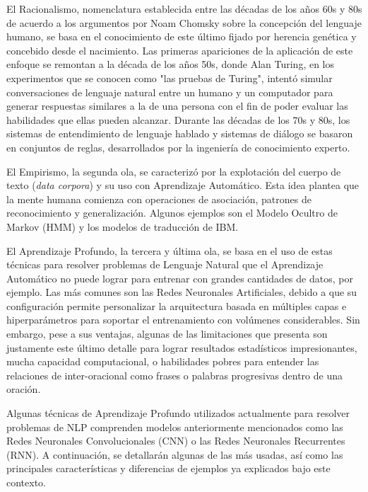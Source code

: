 El Racionalismo, nomenclatura establecida entre las décadas de los años 60s y 80s de acuerdo a los argumentos por Noam Chomsky sobre la concepción del lenguaje humano, se basa en el conocimiento de este último fijado por herencia genética y concebido desde el nacimiento. Las primeras apariciones de la aplicación de este enfoque se remontan a la década de los años 50s, donde Alan Turing, en los experimentos que se conocen como "las pruebas de Turing", intentó simular conversaciones de lenguaje natural entre un humano y un computador para generar respuestas similares a la de una persona con el fin de poder evaluar las habilidades que ellas pueden alcanzar. Durante las décadas de los 70s y 80s, los sistemas de entendimiento de lenguaje hablado y sistemas de diálogo se basaron en conjuntos de reglas, desarrollados por la ingeniería de conocimiento experto.

El Empirismo, la segunda ola, se caracterizó por la explotación del cuerpo de texto (\textit{data corpora}) y su uso con Aprendizaje Automático. Esta idea plantea que la mente humana comienza con operaciones de asociación, patrones de reconocimiento y generalización. Algunos ejemplos son el Modelo Ocultro de Markov (HMM) y los modelos de traducción de IBM.

El Aprendizaje Profundo, la tercera y última ola, se basa en el uso de estas técnicas para resolver problemas de Lenguaje Natural que el Aprendizaje Automático no puede lograr para entrenar con grandes cantidades de datos, por ejemplo. Las más comunes son las Redes Neuronales Artificiales, debido a que su configuración permite personalizar la arquitectura basada en múltiples capas e hiperparámetros para soportar el entrenamiento con volúmenes considerables. Sin embargo, pese a sus ventajas, algunas de las limitaciones que presenta son justamente este último detalle para lograr resultados estadísticos impresionantes, mucha capacidad computacional, o habilidades pobres para entender las relaciones de inter-oracional como frases o palabras progresivas dentro de una oración.

Algunas técnicas de Aprendizaje Profundo utilizados actualmente para resolver problemas de NLP comprenden modelos anteriormente mencionados como las Redes Neuronales Convolucionales (CNN) o las Redes Neuronales Recurrentes (RNN). A continuación, se detallarán algunas de las más usadas, así como las principales características y diferencias de ejemplos ya explicados bajo este contexto.

